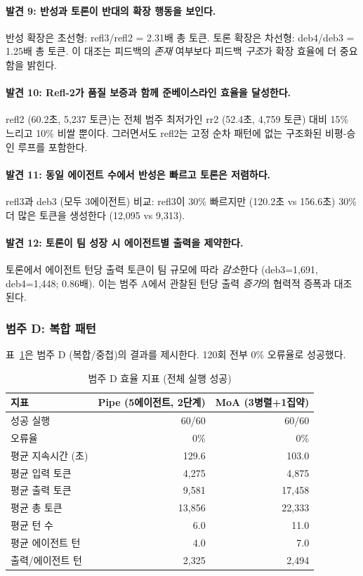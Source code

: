 \documentclass[a4paper,11pt]{article}
\begin{document}
\paragraph{발견 9: 반성과 토론이 반대의 확장 행동을 보인다.}
반성 확장은 초선형: refl3/refl2 = 2.31배 총 토큰. 토론 확장은 차선형: deb4/deb3 = 1.25배 총 토큰. 이 대조는 피드백의 \emph{존재} 여부보다 피드백 \emph{구조}가 확장 효율에 더 중요함을 밝힌다.

\paragraph{발견 10: Refl-2가 품질 보증과 함께 준베이스라인 효율을 달성한다.}
refl2 (60.2초, 5,237 토큰)는 전체 범주 최저가인 rr2 (52.4초, 4,759 토큰) 대비 15\% 느리고 10\% 비쌀 뿐이다. 그러면서도 refl2는 고정 순차 패턴에 없는 구조화된 비평-승인 루프를 포함한다.

\paragraph{발견 11: 동일 에이전트 수에서 반성은 빠르고 토론은 저렴하다.}
refl3과 deb3 (모두 3에이전트) 비교: refl3이 30\% 빠르지만 (120.2초 vs 156.6초) 30\% 더 많은 토큰을 생성한다 (12,095 vs 9,313).

\paragraph{발견 12: 토론이 팀 성장 시 에이전트별 출력을 제약한다.}
토론에서 에이전트 턴당 출력 토큰이 팀 규모에 따라 \emph{감소}한다 (deb3=1,691, deb4=1,448; 0.86배). 이는 범주 A에서 관찰된 턴당 출력 \emph{증가}의 협력적 증폭과 대조된다.

\subsubsection{범주 D: 복합 패턴}

표~\ref{tab:cat-d}은 범주 D (복합/중첩)의 결과를 제시한다. 120회 전부 0\% 오류율로 성공했다.

\begin{table}[H]
\centering
\caption{범주 D 효율 지표 (전체 실행 성공)}
\label{tab:cat-d}
{\small
\begin{tabular}{lrr}
\toprule
지표 & Pipe (5에이전트, 2단계) & MoA (3병렬+1집약) \\
\midrule
성공 실행       & 60/60 & 60/60 \\
오류율           & 0\% & 0\% \\
평균 지속시간 (초) & 129.6 & 103.0 \\
평균 입력 토큰   & 4,275 & 4,875 \\
평균 출력 토큰   & 9,581 & 17,458 \\
평균 총 토큰     & 13,856 & 22,333 \\
평균 턴 수       & 6.0 & 11.0 \\
평균 에이전트 턴 & 4.0 & 7.0 \\
출력/에이전트 턴 & 2,325 & 2,494 \\
\bottomrule
\end{tabular}
}
\end{table}
\end{document}
